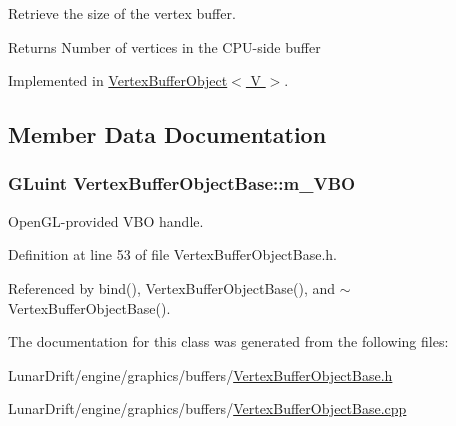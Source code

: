 Retrieve the size of the vertex buffer. 

\begin{DoxyReturn}{Returns}
Number of vertices in the C\+P\+U-\/side buffer 
\end{DoxyReturn}


Implemented in \hyperlink{class_vertex_buffer_object_a9c6c36c1711d4fd1d1aae6916c35c9db}{Vertex\+Buffer\+Object$<$ V $>$}.



\subsection{Member Data Documentation}
\subsubsection[{\texorpdfstring{m\+\_\+\+V\+BO}{m_VBO}}]{\setlength{\rightskip}{0pt plus 5cm}G\+Luint Vertex\+Buffer\+Object\+Base\+::m\+\_\+\+V\+BO\hspace{0.3cm}{\ttfamily [private]}}\hypertarget{class_vertex_buffer_object_base_a93987eea648e4c871c404716e1af8b8d}{}\label{class_vertex_buffer_object_base_a93987eea648e4c871c404716e1af8b8d}


Open\+G\+L-\/provided V\+BO handle. 



Definition at line 53 of file Vertex\+Buffer\+Object\+Base.\+h.



Referenced by bind(), Vertex\+Buffer\+Object\+Base(), and $\sim$\+Vertex\+Buffer\+Object\+Base().



The documentation for this class was generated from the following files\+:\begin{DoxyCompactItemize}
\item 
Lunar\+Drift/engine/graphics/buffers/\hyperlink{_vertex_buffer_object_base_8h}{Vertex\+Buffer\+Object\+Base.\+h}\item 
Lunar\+Drift/engine/graphics/buffers/\hyperlink{_vertex_buffer_object_base_8cpp}{Vertex\+Buffer\+Object\+Base.\+cpp}\end{DoxyCompactItemize}

